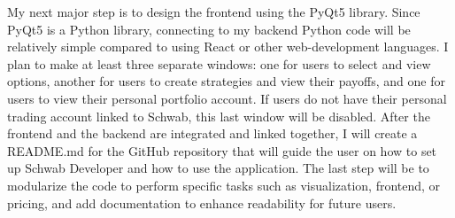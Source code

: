 \documentclass{article}
\begin{document}
\indent My next major step is to design the frontend using the PyQt5 library. Since PyQt5 is a Python library, connecting to my backend Python code will be relatively simple compared to using React or other web-development languages. I plan to make at least three separate windows: one for users to select and view options, another for users to create strategies and view their payoffs, and one for users to view their personal portfolio account. If users do not have their personal trading account linked to Schwab, this last window will be disabled.  
After the frontend and the backend are integrated and linked together, I will create a README.md for the GitHub repository that will guide the user on how to set up Schwab Developer and how to use the application. The last step will be to modularize the code to perform specific tasks such as visualization, frontend, or pricing, and add documentation to enhance readability
for future users. 



\printbibliography




\end{document}
